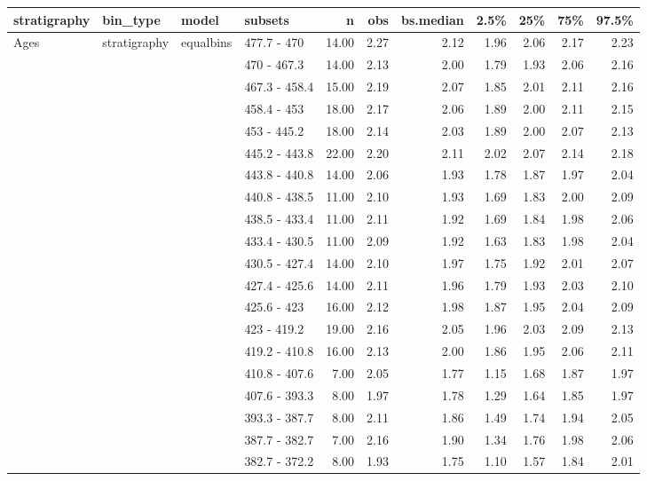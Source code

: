 \begin{longtable}{llllrrrrrrr}
  \hline
stratigraphy & bin\_type & model & subsets & n & obs & bs.median & 2.5\% & 25\% & 75\% & 97.5\% \\ 
  \hline
Ages & stratigraphy & equalbins & 477.7 - 470 & 14.00 & 2.27 & 2.12 & 1.96 & 2.06 & 2.17 & 2.23 \\ 
   &  &  & 470 - 467.3 & 14.00 & 2.13 & 2.00 & 1.79 & 1.93 & 2.06 & 2.16 \\ 
   &  &  & 467.3 - 458.4 & 15.00 & 2.19 & 2.07 & 1.85 & 2.01 & 2.11 & 2.16 \\ 
   &  &  & 458.4 - 453 & 18.00 & 2.17 & 2.06 & 1.89 & 2.00 & 2.11 & 2.15 \\ 
   &  &  & 453 - 445.2 & 18.00 & 2.14 & 2.03 & 1.89 & 2.00 & 2.07 & 2.13 \\ 
   &  &  & 445.2 - 443.8 & 22.00 & 2.20 & 2.11 & 2.02 & 2.07 & 2.14 & 2.18 \\ 
   &  &  & 443.8 - 440.8 & 14.00 & 2.06 & 1.93 & 1.78 & 1.87 & 1.97 & 2.04 \\ 
   &  &  & 440.8 - 438.5 & 11.00 & 2.10 & 1.93 & 1.69 & 1.83 & 2.00 & 2.09 \\ 
   &  &  & 438.5 - 433.4 & 11.00 & 2.11 & 1.92 & 1.69 & 1.84 & 1.98 & 2.06 \\ 
   &  &  & 433.4 - 430.5 & 11.00 & 2.09 & 1.92 & 1.63 & 1.83 & 1.98 & 2.04 \\ 
   &  &  & 430.5 - 427.4 & 14.00 & 2.10 & 1.97 & 1.75 & 1.92 & 2.01 & 2.07 \\ 
   &  &  & 427.4 - 425.6 & 14.00 & 2.11 & 1.96 & 1.79 & 1.93 & 2.03 & 2.10 \\ 
   &  &  & 425.6 - 423 & 16.00 & 2.12 & 1.98 & 1.87 & 1.95 & 2.04 & 2.09 \\ 
   &  &  & 423 - 419.2 & 19.00 & 2.16 & 2.05 & 1.96 & 2.03 & 2.09 & 2.13 \\ 
   &  &  & 419.2 - 410.8 & 16.00 & 2.13 & 2.00 & 1.86 & 1.95 & 2.06 & 2.11 \\ 
   &  &  & 410.8 - 407.6 & 7.00 & 2.05 & 1.77 & 1.15 & 1.68 & 1.87 & 1.97 \\ 
   &  &  & 407.6 - 393.3 & 8.00 & 1.97 & 1.78 & 1.29 & 1.64 & 1.85 & 1.97 \\ 
   &  &  & 393.3 - 387.7 & 8.00 & 2.11 & 1.86 & 1.49 & 1.74 & 1.94 & 2.05 \\ 
   &  &  & 387.7 - 382.7 & 7.00 & 2.16 & 1.90 & 1.34 & 1.76 & 1.98 & 2.06 \\ 
   &  &  & 382.7 - 372.2 & 8.00 & 1.93 & 1.75 & 1.10 & 1.57 & 1.84 & 2.01 \\ 

\end{longtable}
